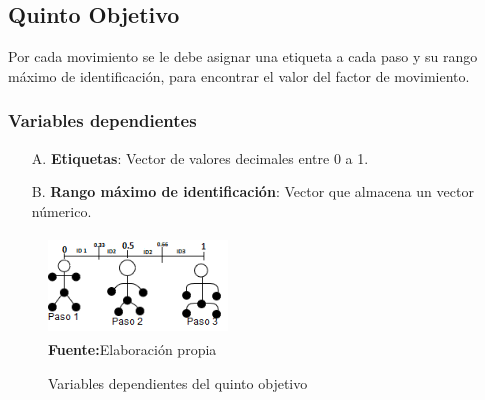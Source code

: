 \subsection{Quinto Objetivo} \label{vr:5o}
Por cada movimiento se le debe asignar una etiqueta a cada paso y su rango m\'aximo de identificaci\'on, para encontrar el valor del factor de movimiento.
\subsubsection{Variables dependientes} \label{vr:5o:dep}
\begin{enumerate}
	\item[A.] \textbf{Etiquetas}: Vector de valores decimales entre 0 a 1.  
	\item[B.] \textbf{Rango m\'aximo de identificaci\'on}: Vector que almacena un vector n\'umerico.
\end{enumerate}	 
\medbreak
\begin{figure}[H]
	\caption{Variables dependientes del quinto objetivo}
	\label{fig:vardep5}
	\centering
	\includegraphics[width=180px,height=100px]{graphics/var-5obj.png} \\
	\textbf{Fuente:}Elaboraci\'on propia 
\end{figure}
\medbreak
